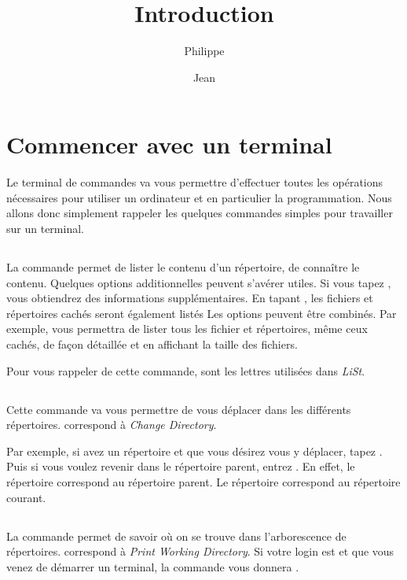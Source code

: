 \documentclass[a4paper]{article}
\title{Introduction}
\author{Philippe \Nom{Rinaudo} \and{} Jean \Nom{Simard}}
\date{\Date[l]{01}{10}{2009}}
\begin{document}
	\maketitle
	\section{Commencer avec un terminal}
		Le terminal de commandes va vous permettre d'effectuer toutes les opérations nécessaires pour utiliser un ordinateur et en particulier la programmation.
		Nous allons donc simplement rappeler les quelques commandes simples pour travailler sur un terminal.
		\subsection{}
			La commande  permet de lister le contenu d'un répertoire, de connaître le contenu.
			Quelques options additionnelles peuvent s'avérer utiles.
			Si vous tapez , vous obtiendrez des informations supplémentaires.
			En tapant , les fichiers et répertoires cachés seront également listés
			Les options peuvent être combinés.
			Par exemple,  vous permettra de lister tous les fichier et répertoires, même ceux cachés, de façon détaillée et en affichant la taille des fichiers.

			Pour vous rappeler de cette commande,  sont les lettres utilisées dans \emph{LiSt}.
		\subsection{}
			Cette commande  va vous permettre de vous déplacer dans les différents répertoires.
			 correspond à \emph{Change Directory}.

			Par exemple, si avez un répertoire  et que vous désirez vous y déplacer, tapez .
			Puis si vous voulez revenir dans le répertoire parent, entrez .
			En effet, le répertoire  correspond au répertoire parent.
			Le répertoire  correspond au répertoire courant.
		\subsection{}
			La commande  permet de savoir où on se trouve dans l'arborescence de répertoires.
			 correspond à \emph{Print Working Directory}.
			Si votre login est  et que vous venez de démarrer un terminal, la commande  vous donnera .
\end{document}
